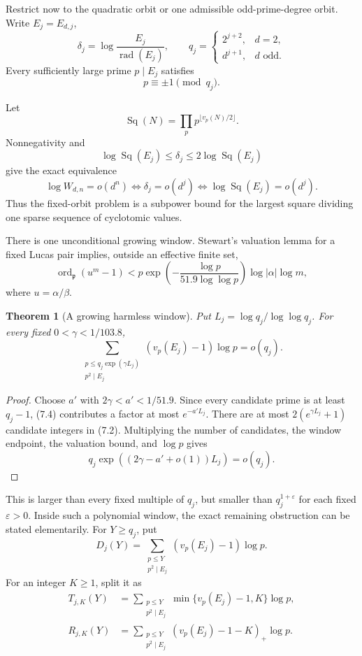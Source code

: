 \documentclass[11pt]{article}
\newtheorem{theorem}{Theorem}
\theoremstyle{definition}
\theoremstyle{remark}
\newcommand{\rad}{\operatorname{rad}}
\newcommand{\Sq}{\operatorname{Sq}}
\begin{document}
Restrict now to the quadratic orbit or one admissible odd-prime-degree
orbit.  Write $E_j=E_{d,j}$,
\[
 \delta_j=\log\frac{E_j}{\rad(E_j)},\qquad
 q_j=\begin{cases}2^{j+2},&d=2,\\d^{j+1},&d\text{ odd}.
 \end{cases}
 \tag{7.1}
\]
Every sufficiently large prime $p\mid E_j$ satisfies
\[
 p\equiv\pm1\pmod{q_j}.
 \tag{7.2}
\]

Let
\[
 \Sq(N)=\prod_p p^{\lfloor v_p(N)/2\rfloor}.
\]
Nonnegativity and
\[
 \log\Sq(E_j)\le\delta_j\le2\log\Sq(E_j)
\]
give the exact equivalence
\[
 \log W_{d,n}=o(d^n)
 \Longleftrightarrow
 \delta_j=o(d^j)
 \Longleftrightarrow
 \log\Sq(E_j)=o(d^j).
 \tag{7.3}
\]
Thus the fixed-orbit problem is a subpower bound for the largest square
dividing one sparse sequence of cyclotomic values.

There is one unconditional growing window.  Stewart's valuation lemma for
a fixed Lucas pair implies, outside an effective finite set,
\[
 \operatorname{ord}_{\mathfrak p}(u^m-1)
 <p\exp\left(-\frac{\log p}{51.9\log\log p}\right)
 \log|\alpha|\log m,
 \tag{7.4}
\]
where $u=\alpha/\beta$.

\begin{theorem}[A growing harmless window]\label{thm:stewart-window}
Put \(L_j=\log q_j/\log\log q_j\).  For every fixed
\(0<\gamma<1/103.8\),
\[
 \sum_{\substack{p\le q_j\exp(\gamma L_j)\\p^2\mid E_j}}
 (v_p(E_j)-1)\log p=o(q_j).
 \tag{7.5}
\]
\end{theorem}

\begin{proof}
Choose $a'$ with \(2\gamma<a'<1/51.9\).  Since every candidate prime
is at least $q_j-1$, (7.4) contributes a factor at most
\(e^{-a'L_j}\).  There are at most
\(2(e^{\gamma L_j}+1)\) candidate integers in (7.2).  Multiplying the
number of candidates, the window endpoint, the valuation bound, and
\(\log p\) gives
\[
 q_j\exp((2\gamma-a'+o(1))L_j)=o(q_j).
\]
\end{proof}

This is larger than every fixed multiple of $q_j$, but smaller than
\(q_j^{1+\varepsilon}\) for each fixed \(\varepsilon>0\).  Inside such a
polynomial window, the exact remaining obstruction can be stated
elementarily.  For $Y\ge q_j$, put
\[
 D_j(Y)=\sum_{\substack{p\le Y\\p^2\mid E_j}}
 (v_p(E_j)-1)\log p.
\]
For an integer $K\ge1$, split it as
\[
 \begin{aligned}
 T_{j,K}(Y)&=\sum_{\substack{p\le Y\\p^2\mid E_j}}
 \min\{v_p(E_j)-1,K\}\log p,\\
 R_{j,K}(Y)&=\sum_{\substack{p\le Y\\p^2\mid E_j}}
 (v_p(E_j)-1-K)_+\log p.
 \end{aligned}
 \tag{7.6}
\]
\end{document}
